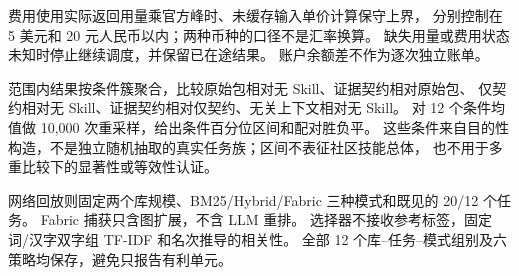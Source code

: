 费用使用实际返回用量乘官方峰时、未缓存输入单价计算保守上界，
分别控制在 5 美元和 20 元人民币以内；两种币种的口径不是汇率换算。
缺失用量或费用状态未知时停止继续调度，并保留已在途结果。
账户余额差不作为逐次独立账单。

范围内结果按条件簇聚合，比较原始包相对无 Skill、证据契约相对原始包、
仅契约相对无 Skill、证据契约相对仅契约、无关上下文相对无 Skill。
对 12 个条件均值做 10,000 次重采样，给出条件百分位区间和配对胜负平。
这些条件来自目的性构造，不是独立随机抽取的真实任务族；区间不表征社区技能总体，
也不用于多重比较下的显著性或等效性认证。

网络回放则固定两个库规模、BM25/Hybrid/Fabric 三种模式和既见的 20/12 个任务。
Fabric 捕获只含图扩展，不含 LLM 重排。
选择器不接收参考标签，固定词/汉字双字组 TF-IDF 和名次推导的相关性。
全部 12 个库--任务--模式组别及六策略均保存，避免只报告有利单元。
